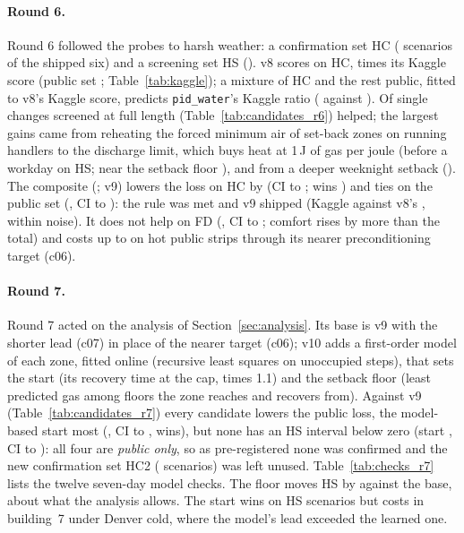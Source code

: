\documentclass{article}
\begin{document}
\paragraph{Round 6.}
Round 6 followed the probes to harsh weather: a confirmation set HC (\RSixHarshCN{} scenarios
of the shipped six) and a screening set HS (\RSixHarshSN). v8 scores \RSixHarshCVEight{} on HC,
\RSixHarshCLevel{} times its Kaggle score (public set \RSixPubLevel; Table~\ref{tab:kaggle}); a mixture of
\RSixMixWPct{} HC and the rest public, fitted to v8's Kaggle score, predicts \texttt{pid\_water}'s Kaggle ratio
(\RSixMixPid{} against \RSixKagRatioPid). Of \RSixNSingles{} single changes screened at full length
(Table~\ref{tab:candidates_r6}) \RSixNHelps{} helped; the largest gains came from reheating the forced minimum air of
set-back zones on running handlers to the discharge limit, which buys heat at 1\,J of gas per joule (before a workday
\RSixScrCElevenHsRel{} on HS; near the setback floor \RSixScrCNineHsRel), and from a deeper weeknight setback
(\RSixScrCEightHsRel). The composite
(\RSixCompMembers; v9) lowers the loss on HC by \RSixConfHarshCRelAbs{} (CI \RSixConfHarshCRelHiAbs{} to
\RSixConfHarshCRelLoAbs; wins \RSixConfHarshCWins) and ties on the public set (\RSixConfPubRel, CI \RSixConfPubRelLo{} to
\RSixConfPubRelHi): the rule was met and v9 shipped (Kaggle \RSevKagVNine{} against v8's \RSixKagVEight, within noise).
It does not help on FD (\RSixConfFreshDefRel, CI \RSixConfFreshDefRelLo{} to \RSixConfFreshDefRelHi; comfort rises by
more than the total) and costs up to \RSixConfPubWorstRel{} on hot public strips through its nearer preconditioning
target (c06).

\paragraph{Round 7.}
Round 7 acted on the analysis of Section~\ref{sec:analysis}. Its base is v9 with the shorter lead (c07) in place of
the nearer target (c06); v10 adds a first-order model of each zone, fitted online (recursive least squares on unoccupied
steps), that sets the start (its recovery time at the cap, times 1.1) and the setback floor (least predicted gas
among floors the zone reaches and recovers from). Against v9 (Table~\ref{tab:candidates_r7}) every candidate lowers
the public loss, the model-based start most (\RSevScrMbrPubRel, CI \RSevScrMbrPubLo{} to \RSevScrMbrPubHi,
\RSevScrMbrPubWins{} wins), but none has an HS interval below zero (start \RSevScrMbrHsRel, CI \RSevScrMbrHsLo{} to
\RSevScrMbrHsHi): all four are \emph{public only}, so as pre-registered none was confirmed and the new confirmation
set HC2 (\RSevHCTwoN{} scenarios) was left unused. Table~\ref{tab:checks_r7} lists the twelve seven-day model checks. The floor moves HS by \RSevMbfVsBaseHsRel{} against the base,
about what the analysis allows. The start wins on \RSevMbrHsWins{} HS scenarios but costs
\RSevMbrHsWorstRel{} in building~7 under Denver cold, where the model's lead exceeded the learned one.

\end{document}
